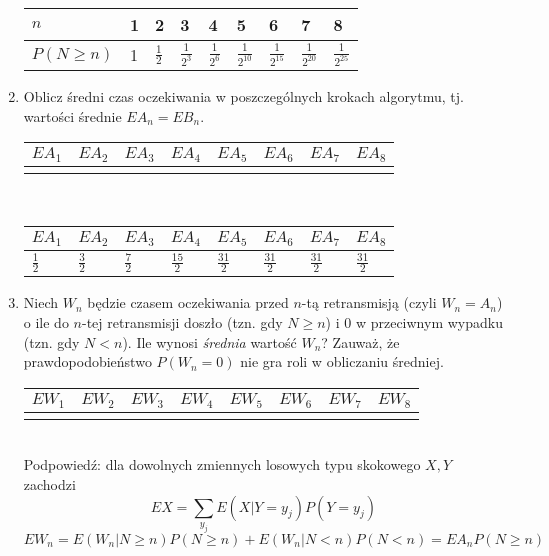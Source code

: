 \documentclass[twoside]{mwart}
\newenvironment{ansenv}{\comment}{\endcomment}
\newenvironment{ansenv}{\paragraph{Odpowiedź:}}{}
\begin{document}
\begin{enumerate}
\begin{ansenv}
\begin{tabular}{l|p{1.3cm}|p{1.3cm}|p{1.3cm}|p{1.3cm}|p{1.3cm}|p{1.3cm}|p{1.3cm}|p{1.3cm}}
		$n$ & 1 & 2 & 3 & 4 & 5 & 6 & 7 & 8 \\
		\hline
		$P(N\geq n)$ & 1 & $\frac{1}{2}$ & $\frac{1}{2^3}$ & $\frac{1}{2^6}$ & $\frac{1}{2^{10}}$ & $\frac{1}{2^{15}}$ & $\frac{1}{2^{20}}$ & $\frac{1}{2^{25}}$ 
	\end{tabular}
\end{ansenv}
\item Oblicz średni czas oczekiwania w poszczególnych krokach algorytmu, tj. wartości średnie $EA_n=EB_n$.
\begin{tabular}{p{1.3cm}|p{1.3cm}|p{1.3cm}|p{1.3cm}|p{1.3cm}|p{1.3cm}|p{1.3cm}|p{1.3cm}}
	$EA_1$ & $EA_2$ & $EA_3$ & $EA_4$ & $EA_5$ & $EA_6$ & $EA_7$ & $EA_8$ \\
	\hline
	& & & & & & & 
\end{tabular}
\vspace{1cm}\\
\begin{ansenv}
	\begin{tabular}{p{1.3cm}|p{1.3cm}|p{1.3cm}|p{1.3cm}|p{1.3cm}|p{1.3cm}|p{1.3cm}|p{1.3cm}}
		$EA_1$ & $EA_2$ & $EA_3$ & $EA_4$ & $EA_5$ & $EA_6$ & $EA_7$ & $EA_8$ \\
		\hline
		$\frac{1}{2}$ & $\frac{3}{2}$ & $\frac{7}{2}$ & $\frac{15}{2}$ & $\frac{31}{2}$ & $\frac{31}{2}$ & $\frac{31}{2}$ & $\frac{31}{2}$ 
	\end{tabular}
\end{ansenv}
\item Niech $W_n$ będzie czasem oczekiwania przed $n$-tą retransmisją (czyli $W_n=A_n$) o ile do $n$-tej retransmisji doszło (tzn. gdy $N\geq n$) i $0$ w przeciwnym wypadku (tzn. gdy $N<n$).
Ile wynosi \emph{średnia} wartość $W_n$?
Zauważ, że prawdopodobieństwo $P(W_n=0)$ nie gra roli w obliczaniu średniej.\\
\begin{tabular}{p{1.3cm}|p{1.3cm}|p{1.3cm}|p{1.3cm}|p{1.3cm}|p{1.3cm}|p{1.3cm}|p{1.3cm}}
$EW_1$ & $EW_2$ & $EW_3$ & $EW_4$ & $EW_5$ & $EW_6$ & $EW_7$ & $EW_8$ \\
\hline
 & & & & & & & 
\end{tabular}
\vspace{1cm}\\
Podpowiedź: dla dowolnych zmiennych losowych typu skokowego $X, Y$ zachodzi 
\[EX = \sum_{y_j} E\left(X|Y=y_j\right)P(Y=y_j) \]
\begin{ansenv}
	\[ EW_n = E(W_n|N\geq n)P(N\geq n) + E(W_n|N<n)P(N<n) = EA_nP(N\geq n)\]
	\begin{tabular}{p{1.3cm}|p{1.3cm}|p{1.3cm}|p{1.3cm}|p{1.3cm}|p{1.3cm}|p{1.3cm}|p{1.3cm}}

\end{tabular}
\end{ansenv}
\end{enumerate}
\end{document}
